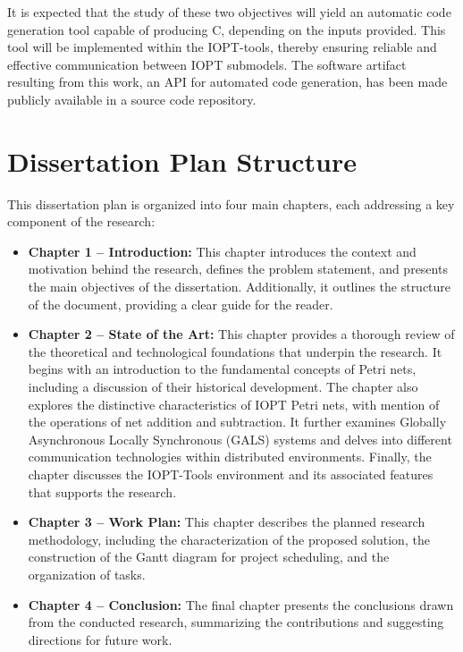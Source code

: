 It is expected that the study of these two objectives will yield an automatic code generation tool capable of producing C, depending on the inputs provided. This tool will be implemented within the IOPT-tools, thereby ensuring reliable and effective communication between IOPT submodels.
The software artifact resulting from this work, an API for automated code generation, has been made publicly available in a source code repository.




\section{Dissertation Plan Structure}
\label{sec:dissertation_structure}


This dissertation plan is organized into four main chapters, each addressing a key component of the research:

\begin{itemize}
    \item \textbf{Chapter 1 – Introduction:}  
    This chapter introduces the context and motivation behind the research, defines the problem statement, and presents the main objectives of the dissertation. Additionally, it outlines the structure of the document, providing a clear guide for the reader.

   \item \textbf{Chapter 2 – State of the Art:}  
This chapter provides a thorough review of the theoretical and technological foundations that underpin the research. It begins with an introduction to the fundamental concepts of Petri nets, including a discussion of their historical development. The chapter also explores the distinctive characteristics of IOPT Petri nets, with mention of the operations of net addition and subtraction. It further examines Globally Asynchronous Locally Synchronous (GALS) systems and delves into different communication technologies within distributed environments. Finally, the chapter discusses the IOPT-Tools environment and its associated features that supports the research.

    \item \textbf{Chapter 3 – Work Plan:}  
    This chapter describes the planned research methodology, including the characterization of the proposed solution, the construction of the Gantt diagram for project scheduling, and the organization of tasks.

    \item \textbf{Chapter 4 – Conclusion:}  
    The final chapter presents the conclusions drawn from the conducted research, summarizing the contributions and suggesting directions for future work.
\end{itemize}


